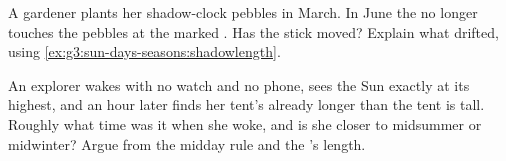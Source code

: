\begin{exercise}[$\star\star$]\label{exo:g3:sun-days-seasons:10}
A gardener plants her shadow-clock pebbles in March. In June the
 no longer touches the pebbles at the marked . Has the
stick moved? Explain what drifted, using
\cref{ex:g3:sun-days-seasons:shadowlength}.
\end{exercise}

\begin{exercise}[$\star\star$]\label{exo:g3:sun-days-seasons:11}
An explorer wakes with no watch and no phone, sees the Sun exactly
at its highest, and an hour later finds her tent's  already
longer than the tent is tall. Roughly what time was it when she
woke, and is she closer to midsummer or midwinter? Argue from the
midday rule and the 's length.
\end{exercise}
